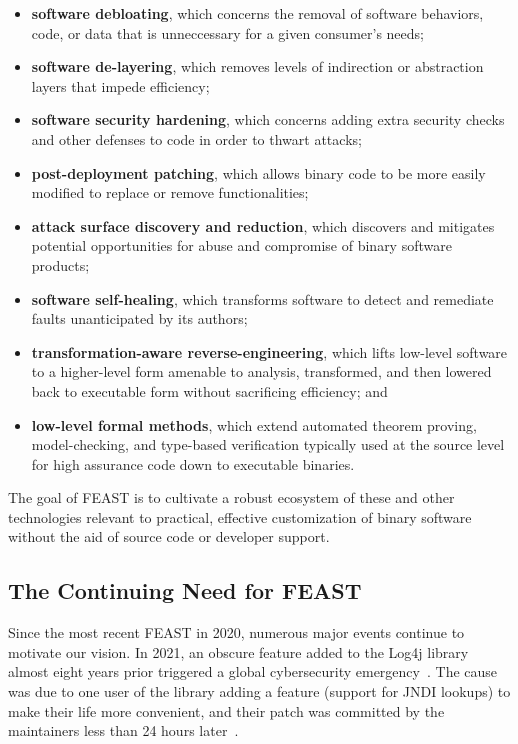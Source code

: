 \documentclass[sigconf]{acmart}
\begin{document}
\begin{itemize}[itemsep=.5ex plus1pt minus0pt]
  \item \textbf{software debloating}, which concerns the removal of software behaviors, code, or data that is unneccessary for a given consumer's needs;
  \item \textbf{software de-layering}, which removes levels of indirection or abstraction layers that impede efficiency;
  \item \textbf{software security hardening}, which concerns adding extra security checks and other defenses to code in order to thwart attacks;
  \item \textbf{post-deployment patching}, which allows binary code to be more easily modified to replace or remove functionalities;
  \item \textbf{attack surface discovery and reduction}, which discovers and mitigates potential opportunities for abuse and compromise of binary software products;
  \item \textbf{software self-healing}, which transforms software to detect and remediate faults unanticipated by its authors;
  \item \textbf{transformation-aware reverse-engineering}, which lifts low-level software to a higher-level form amenable to analysis, transformed, and then lowered back to executable form without sacrificing efficiency; and
  \item \textbf{low-level formal methods}, which extend automated theorem proving, model-checking, and type-based verification typically used at the source level for high assurance code down to executable binaries.
\end{itemize}

The goal of FEAST is to cultivate a robust ecosystem of these and other
technologies relevant to practical, effective customization of binary software
without the aid of source code or developer support.

\subsection{The Continuing Need for FEAST}
Since the most recent FEAST in 2020, numerous major events continue to motivate our vision.
In 2021, an obscure feature added to the Log4j library
almost eight years prior triggered a global cybersecurity emergency~\cite{cisalog4j}.  The cause was
due to one user of the library adding a feature (support for JNDI lookups) to
make their life more convenient, and their patch was committed by the
maintainers less than 24 hours later~\cite{jndiflaw}.
\end{document}
